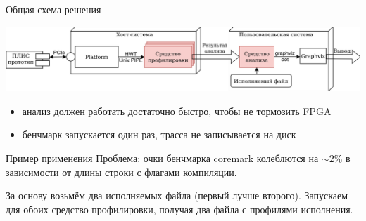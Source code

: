 \documentclass[10pt,aspectratio=169,hyperref={pdftex,unicode},xcolor=dvipsnames]{beamer}
\begin{document}
\begin{frame}{ Общая схема решения }
    \begin{center}
        \includegraphics[width=\textwidth,keepaspectratio]{./images/stac_arch.png}
    \end{center}
    \begin{itemize}
        \pause \item анализ должен работать достаточно быстро, чтобы не тормозить FPGA
        \pause \item бенчмарк запускается один раз, трасса не записывается на диск
    \end{itemize}
\end{frame}

\begin{frame}{ Пример применения }
    Проблема: очки бенчмарка \href{https://github.com/eembc/coremark}{coremark}
    колеблются на $\sim2\%$ в зависимости от длины строки с флагами компиляции.

    За основу возьмём два исполняемых файла (первый лучше второго).
    Запускаем для обоих средство профилировки, получая два файла с профилями исполнения.
\end{frame}
\end{document}
